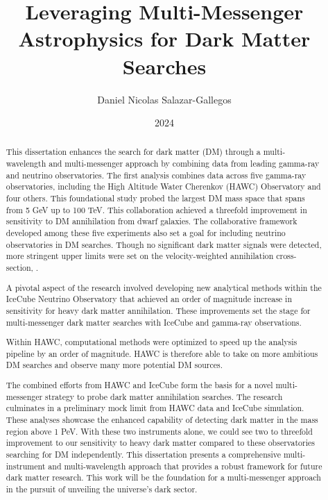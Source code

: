 \documentclass[lscape,PhD]{msu-thesis}
\title{Leveraging Multi-Messenger Astrophysics for Dark Matter Searches}
\author{Daniel Nicolas Salazar-Gallegos}
\date{2024}
\begin{document}
\frontmatter
\maketitlepage

\begin{abstract}

    This dissertation enhances the search for dark matter (DM) through a multi-wavelength and multi-messenger approach by combining data from leading gamma-ray and neutrino observatories.
    The first analysis combines data across five gamma-ray observatories, including the High Altitude Water Cherenkov (HAWC) Observatory and four others.
    This foundational study probed the largest DM mass space that spans from 5 GeV up to 100 TeV.
    This collaboration  achieved a threefold improvement in sensitivity to DM annihilation from dwarf galaxies.
    The collaborative framework developed among these five experiments also set a goal for including neutrino observatories in DM searches.
    Though no significant dark matter signals were detected, more stringent upper limits were set on the velocity-weighted annihilation cross-section, \sv.

    A pivotal aspect of the research involved developing new analytical methods within the IceCube Neutrino Observatory that achieved an order of magnitude increase in sensitivity for heavy dark matter annihilation.
    These improvements set the stage for multi-messenger dark matter searches with IceCube and gamma-ray observations.

    Within HAWC, computational methods were optimized to speed up the analysis pipeline by an order of magnitude.
    HAWC is therefore able to take on more ambitious DM searches and observe many more potential DM sources.

    The combined efforts from HAWC and IceCube form the basis for a novel multi-messenger strategy to probe dark matter annihilation searches.
    The research culminates in a preliminary mock limit from HAWC data and IceCube simulation.
    These analyses showcase the enhanced capability of detecting dark matter in the mass region above 1 PeV.
    With these two instruments alone, we could see two to threefold improvement to our sensitivity to heavy dark matter compared to these observatories searching for DM independently.
    This dissertation presents a comprehensive multi-instrument and multi-wavelength approach that provides a robust framework for future dark matter research.
    This work will be the foundation for a multi-messenger approach in the pursuit of unveiling the universe's dark sector.

\end{abstract}
\end{document}
